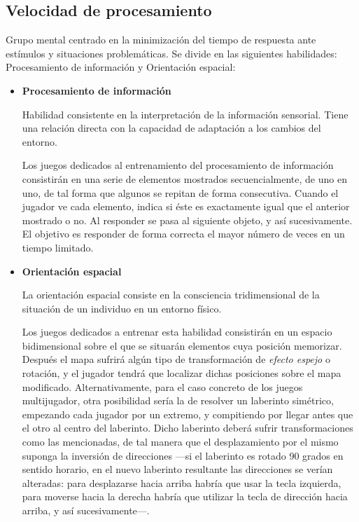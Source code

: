 \subsection{Velocidad de procesamiento}

Grupo mental centrado en la minimización del tiempo de respuesta ante estímulos y situaciones problemáticas. Se divide en las siguientes habilidades: Procesamiento de información y Orientación espacial:

\begin{itemize}

\item {\bf Procesamiento de información}

Habilidad consistente en la interpretación de la información sensorial. Tiene una relación directa con la capacidad de adaptación a los cambios del entorno.

Los juegos dedicados al entrenamiento del procesamiento de información consistirán en una serie de elementos mostrados secuencialmente, de uno en uno, de tal forma que algunos se repitan de forma consecutiva. Cuando el jugador ve cada elemento, indica si éste es exactamente igual que el anterior mostrado o no. Al responder se pasa al siguiente objeto, y así sucesivamente. El objetivo es responder de forma correcta el mayor número de veces en un tiempo limitado.

\item {\bf Orientación espacial}

La orientación espacial consiste en la consciencia tridimensional de la situación de un individuo en un entorno físico.

Los juegos dedicados a entrenar esta habilidad consistirán en un espacio bidimensional sobre el que se situarán elementos cuya posición memorizar. Después el mapa sufrirá algún tipo de transformación de {\it efecto espejo} o rotación, y el jugador tendrá que localizar dichas posiciones sobre el mapa modificado. Alternativamente, para el caso concreto de los juegos multijugador, otra posibilidad sería la de resolver un laberinto simétrico, empezando cada jugador por un extremo, y compitiendo por llegar antes que el otro al centro del laberinto. Dicho laberinto deberá sufrir transformaciones como las mencionadas, de tal manera que el desplazamiento por el mismo suponga la inversión de direcciones ---si el laberinto es rotado 90 grados en sentido horario, en el nuevo laberinto resultante las direcciones se verían alteradas: para desplazarse hacia arriba habría que usar la tecla izquierda, para moverse hacia la derecha habría que utilizar la tecla de dirección hacia arriba, y así sucesivamente---.


\end{itemize}
